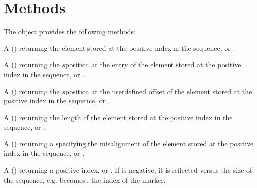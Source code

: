 \documentclass[letterpaper,10pt,english]{sphinxmanual}
\begin{document}
\section{Methods}
\label{\detokenize{sequences:methods}}
\sphinxAtStartPar
The  object provides the following methods:
\begin{description}
\sphinxAtStartPar
A  () returning the element stored at the positive index  in the sequence, or .

\sphinxAtStartPar
A  () returning the \(s\)\sphinxhyphen{}position at the entry of the element stored at the positive index  in the sequence, or .

\sphinxAtStartPar
A  () returning the \(s\)\sphinxhyphen{}position at the user\sphinxhyphen{}defined  offset of the element stored at the positive index 
in the sequence, or .

\sphinxAtStartPar
A  () returning the length of the element stored at the positive index  in the sequence, or .

\sphinxAtStartPar
A  () returning a  specifying the misalignment of the element stored at the positive index  in the sequence, or .

\sphinxAtStartPar
A  () returning a positive index, or . If  is negative, it is reflected versus the size of the sequence, e.g. 
becomes , the index of the  marker.


\end{description}
\end{document}
